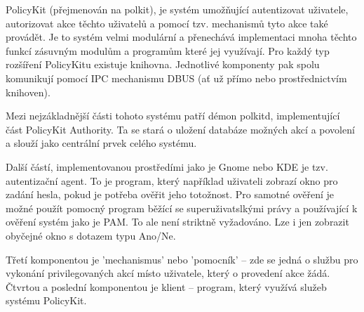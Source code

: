 PolicyKit (přejmenován na polkit), je systém umožňující autentizovat uživatele,
autorizovat akce těchto uživatelů a pomocí tzv. mechanismů tyto akce také
provádět. Je to systém velmi modulární a přenechává implementaci mnoha těchto 
funkcí zásuvným modulům a programům které jej využívají. Pro každý typ rozšíření
PolicyKitu existuje knihovna. Jednotlivé komponenty pak spolu komunikují pomocí
IPC mechanismu DBUS (ať už přímo nebo prostřednictvím knihoven).

Mezi nejzákladnější části tohoto systému patří démon polkitd, implementující
část PolicyKit Authority. Ta se stará o uložení databáze možných akcí
a povolení a slouží jako centrální prvek celého systému.

Další částí, implementovanou prostředími jako je Gnome nebo KDE je tzv.
autentizační agent. To je program, který například uživateli zobrazí okno pro
zadání hesla, pokud je potřeba ověřit jeho totožnost. Pro samotné ověření je
možné použít pomocný program běžící se superuživatslkými právy a používající
k ověření systém jako je PAM. To ale není striktně vyžadováno. Lze i jen
zobrazit obyčejné okno s dotazem typu Ano/Ne.%

Třetí komponentou je 'mechanismus' nebo 'pomocník' -- zde se jedná o službu pro
vykonání privilegovaných akcí místo uživatele, který o provedení akce žádá.
Čtvrtou a poslední komponentou je klient -- program, který využívá služeb
systému PolicyKit.

